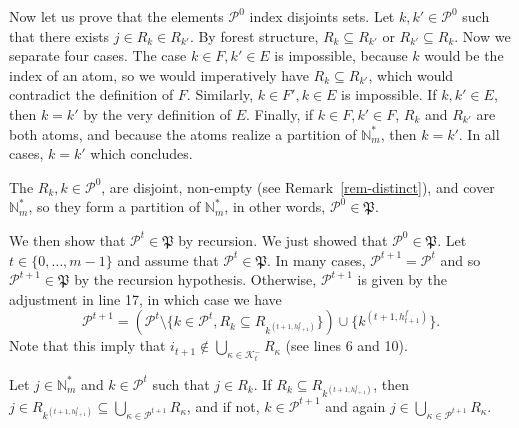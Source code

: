 \documentclass[
  11pt,
  a4paper,
]{article}
\theoremstyle{plain}
\theoremstyle{definition}
\theoremstyle{plain}
\theoremstyle{definition}
\theoremstyle{plain}
\theoremstyle{remark}
\begin{document}
Now let us prove that the elements \(\mathcal{P}^0\) index disjoints
sets. Let \(k, k'\in \mathcal{P}^0\) such that there exists
\(j\in R_{k}\in R_{k'}\). By forest structure, \(R_{k}\subseteq R_{k'}\)
or \(R_{k'}\subseteq R_{k}\). Now we separate four cases. The case
\(k\in F, k'\in E\) is impossible, because \(k\) would be the index of
an atom, so we would imperatively have \(R_{k}\subseteq R_{k'}\), which
would contradict the definition of \(F\). Similarly, \(k\in F', k\in E\)
is impossible. If \(k, k'\in E\), then \(k=k'\) by the very definition
of \(E\). Finally, if \(k\in F, k'\in F\), \(R_k\) and \(R_{k'}\) are
both atoms, and because the atoms realize a partition of
\(\mathbb{N}_m^*\), then \(k=k'\). In all cases, \(k=k'\) which
concludes.

The \(R_k, k\in \mathcal{P}^0\), are disjoint, non-empty (see
Remark~\ref{rem-distinct}), and cover \(\mathbb{N}_m^*\), so they form a
partition of \(\mathbb{N}_m^*\), in other words,
\(\mathcal{P}^0\in\mathfrak P\).

We then show that \(\mathcal{P}^t\in\mathfrak P\) by recursion. We just
showed that \(\mathcal{P}^0\in\mathfrak P\). Let
\(t\in\{ 0,\dotsc,m-1\}\) and assume that
\(\mathcal{P}^t\in\mathfrak P\). In many cases,
\(\mathcal{P}^{t+1}=\mathcal{P}^t\) and so
\(\mathcal{P}^{t+1}\in\mathfrak P\) by the recursion hypothesis.
Otherwise, \(\mathcal{P}^{t+1}\) is given by the adjustment in line 17,
in which case we have \begin{equation}\label{eq_rel_rec_p}
\mathcal{P}^{t+1}=\left(\mathcal{P}^t \setminus\{k\in\mathcal{P}^t, R_k\subseteq R_{  k^{(t+1,h^f_{t+1})}   }   \}  \right)\cup \{ k^{(t+1,h^f_{t+1})} \}.
\end{equation} Note that this imply that
\(i_{t+1}\not\in\bigcup_{\kappa \in \mathcal{K}^-_t} R_{\kappa}\) (see
lines 6 and 10).

Let \(j\in\mathbb{N}_m^*\) and \(k\in\mathcal{P}^t\) such that
\(j\in R_k\). If \(R_k\subseteq R_{  k^{(t+1,h^f_{t+1})}   }\), then
\(j\in R_{  k^{(t+1,h^f_{t+1})}   }\subseteq \bigcup_{\kappa\in \mathcal{P}^{t+1}} R_{\kappa}\),
and if not, \(k\in\mathcal{P}^{t+1}\) and again
\(j\in \bigcup_{\kappa\in \mathcal{P}^{t+1}} R_{\kappa}\).
\end{document}

